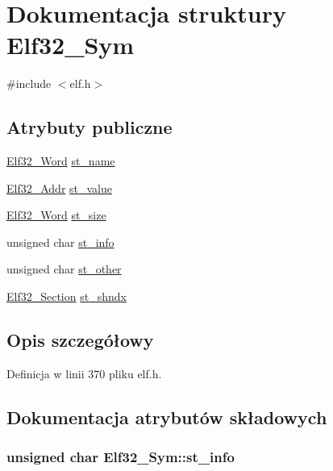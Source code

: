 \hypertarget{struct_elf32___sym}{\section{Dokumentacja struktury Elf32\-\_\-\-Sym}
\label{struct_elf32___sym}
}


{\ttfamily \#include $<$elf.\-h$>$}

\subsection*{Atrybuty publiczne}
\begin{DoxyCompactItemize}
\item 
\hyperlink{elf_8h_af5924ece606c732e86f8263a19408e45}{Elf32\-\_\-\-Word} \hyperlink{struct_elf32___sym_a6a972b30868879f8a1e071e0c45e5031}{st\-\_\-name}
\item 
\hyperlink{elf_8h_a40c6d4571e6001f443cc6a6474620158}{Elf32\-\_\-\-Addr} \hyperlink{struct_elf32___sym_abf8ff76884bc5e2acb5f7eb42f733c2e}{st\-\_\-value}
\item 
\hyperlink{elf_8h_af5924ece606c732e86f8263a19408e45}{Elf32\-\_\-\-Word} \hyperlink{struct_elf32___sym_a1b410e69fecd2610bc7e58d2b0245053}{st\-\_\-size}
\item 
unsigned char \hyperlink{struct_elf32___sym_a7d131c44ec48708b1c98f9b00ca9d528}{st\-\_\-info}
\item 
unsigned char \hyperlink{struct_elf32___sym_a2e1bf6bedb5180f74ea8cbaf9cedfd36}{st\-\_\-other}
\item 
\hyperlink{elf_8h_abaffe34cd8a7e31c8f57ebf85c17ca34}{Elf32\-\_\-\-Section} \hyperlink{struct_elf32___sym_abfa99b2ee1f5f6dbc5d5d348e753a7cb}{st\-\_\-shndx}
\end{DoxyCompactItemize}


\subsection{Opis szczegółowy}


Definicja w linii 370 pliku elf.\-h.



\subsection{Dokumentacja atrybutów składowych}
\hypertarget{struct_elf32___sym_a7d131c44ec48708b1c98f9b00ca9d528}{
\subsubsection[{st\-\_\-info}]{\setlength{\rightskip}{0pt plus 5cm}unsigned char Elf32\-\_\-\-Sym\-::st\-\_\-info}}\label{struct_elf32___sym_a7d131c44ec48708b1c98f9b00ca9d528}


